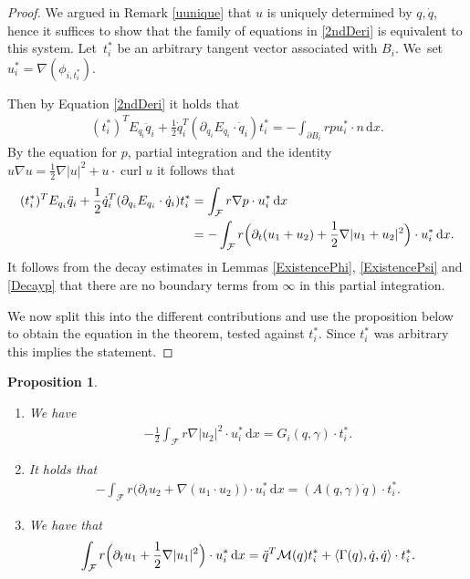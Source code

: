 \documentclass[JEP,XML,SOM,Unicode,published]{cedram}
\newtheorem{proposition}[theorem]{Proposition}
\theoremstyle{definition}
\DeclareMathOperator{\curl}{curl}
\newcommand\scalar[2]{\langle #1,#2\rangle}
\newcommand\eq{=}
\newcommand\dd{\,\mathrm{d}}
\newcommand\dx{\dd x}
\let\de\partial
\let\mel\relax
\begin{document}
\begin{proof}
We argued in Remark \ref{uunique} that $u$ is uniquely determined by $q,\dot{q}$, hence it suffices to show that the family of equations in \eqref{2ndDeri} is equivalent to this system. Let~$t_i^*$ be an arbitrary tangent vector associated with $B_i$. We~set $u_i^*=\nabla(\phi_{i,t_i^*})$.

Then by Equation \ref{2ndDeri} it holds that
\begin{align*}
(t_i^*)^TE_{q_i}\ddot{q}_i+\frac{1}{2}\dot{q}_i^T(\de_{q_i}E_{q_i}\cdot\dot{q}_i)t_i^*\eq -\int_{\de B_i} rpu_i^*\cdot n\dx.
\end{align*}
By the equation for $p$, partial integration and the identity $u\nabla u=\frac{1}{2}\nabla|u|^2+u\cdot \curl u$ it follows that
\begin{align*}
\mel(t_i^*)^TE_{q_i}\ddot{q}_i+\frac{1}{2}\dot{q}_i^T(\de_{q_i}E_{q_i}\cdot\dot{q}_i)t_i^*&\eq\int_{\mathcal{F}}r\nabla p\cdot u_i^*\dx\\
&\eq-\int _{\mathcal{F}}r\Bigl(\de_t(u_1+u_2)+\frac{1}{2}\nabla|u_1+u_2|^2\Bigr)\cdot u_i^*\dx.
\end{align*}
It follows from the decay estimates in Lemmas \ref{ExistencePhi}, \ref{ExistencePsi} and \ref{Decayp} that there are no boundary terms from $\infty$ in this partial integration.

We now split this into the different contributions and use the proposition below to obtain the equation in the theorem, tested against $t_i^*$. Since $t_i^*$ was arbitrary this implies the statement.\end{proof} 

\skpt
\begin{proposition}\label{Coefficients}
\begin{enumerate}
\item\label{Coefficientsa}
We have
\begin{align*}
-\frac{1}{2}\int_\mathcal{F} r\nabla|u_2|^2\cdot u_i^*\dx\eq G_i(q,\gamma)\cdot t_i^*.
\end{align*}
\item\label{Coefficientsb}
It holds that
\begin{align*}
-\int_\mathcal{F} r\bigl(\de_tu_2+\nabla(u_1\cdot u_2)\bigr)\cdot u_i^*\dx\eq (A(q,\gamma)\dot{q})\cdot t_i^*.
\end{align*}
\item\label{Coefficientsc}
We have that
\begin{align*}
\int_\mathcal{F} r\Bigl(\de_t u_1+\frac{1}{2}\nabla|u_1|^2 \Bigr)\cdot u_i^*\dx\eq \ddot{q}^T\mathcal{M}(q)t_i^*+\scalar{\Gamma(q),\dot{q}}{\dot{q}}\cdot t_i^*.
\end{align*}
\end{enumerate}
\end{proposition}
\end{document}
